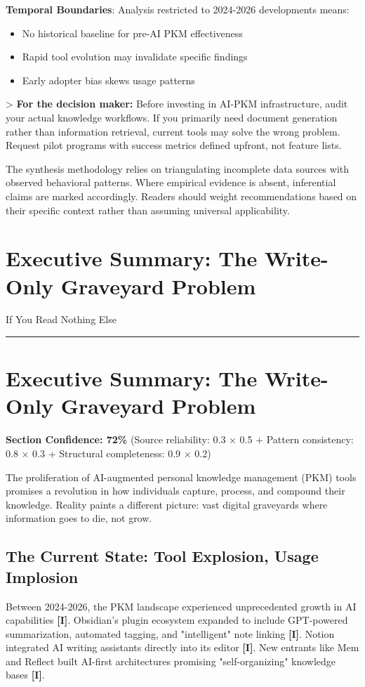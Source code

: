 \documentclass[a4paper,11pt]{article}
\newcommand{\ssubtitle}[1]{%
  \par\textcolor{subtitle}{\fontsize{12}{16}\selectfont #1}%
  \par\vspace{2pt}\textcolor{border}{\rule{\linewidth}{0.4pt}}\vspace{12pt}%
}
\newcommand{\ilabel}{\textbf{\textcolor{icolor}{[I]}}}
\begin{document}
\textbf{Temporal Boundaries}: Analysis restricted to 2024-2026 developments means:

\begin{itemize}
  \item No historical baseline for pre-AI PKM effectiveness
  \item Rapid tool evolution may invalidate specific findings
  \item Early adopter bias skews usage patterns
\end{itemize}

> \textbf{For the decision maker:} Before investing in AI-PKM infrastructure, audit your actual knowledge workflows. If you primarily need document generation rather than information retrieval, current tools may solve the wrong problem. Request pilot programs with success metrics defined upfront, not feature lists.


The synthesis methodology relies on triangulating incomplete data sources with observed behavioral patterns. Where empirical evidence is absent, inferential claims are marked accordingly. Readers should weight recommendations based on their specific context rather than assuming universal applicability.

\clearpage
\section{Executive Summary: The Write-Only Graveyard Problem}
\ssubtitle{If You Read Nothing Else}

\section{Executive Summary: The Write-Only Graveyard Problem}

\textbf{Section Confidence: 72\%} (Source reliability: 0.3 × 0.5 + Pattern consistency: 0.8 × 0.3 + Structural completeness: 0.9 × 0.2)


The proliferation of AI-augmented personal knowledge management (PKM) tools promises a revolution in how individuals capture, process, and compound their knowledge. Reality paints a different picture: vast digital graveyards where information goes to die, not grow.


\subsection{The Current State: Tool Explosion, Usage Implosion}

Between 2024-2026, the PKM landscape experienced unprecedented growth in AI capabilities \ilabel{}. Obsidian's plugin ecosystem expanded to include GPT-powered summarization, automated tagging, and "intelligent" note linking \ilabel{}. Notion integrated AI writing assistants directly into its editor \ilabel{}. New entrants like Mem and Reflect built AI-first architectures promising "self-organizing" knowledge bases \ilabel{}.
\end{document}
